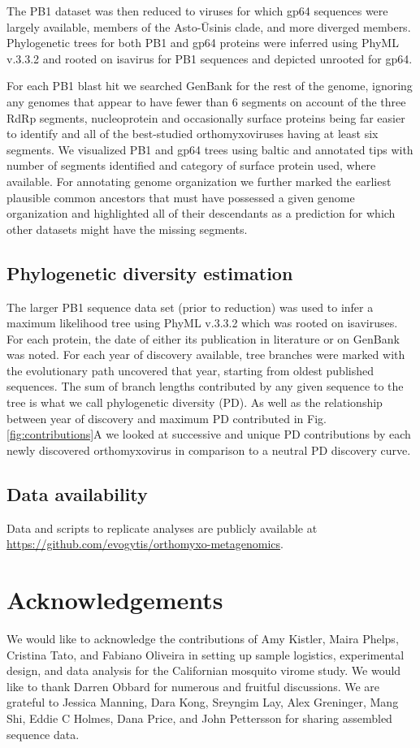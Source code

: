 \documentclass[11pt,twocolumn]{article}
\begin{document}
The PB1 dataset was then reduced to viruses for which gp64 sequences were largely available, members of the Asto-\={U}sinis clade, and more diverged members.
Phylogenetic trees for both PB1 and gp64 proteins were inferred using PhyML v.3.3.2 and rooted on isavirus for PB1 sequences and depicted unrooted for gp64.

For each PB1 blast hit we searched GenBank for the rest of the genome, ignoring any genomes that appear to have fewer than 6 segments on account of the three RdRp segments, nucleoprotein and occasionally surface proteins being far easier to identify and all of the best-studied orthomyxoviruses having at least six segments.
We visualized PB1 and gp64 trees using baltic and annotated tips with number of segments identified and category of surface protein used, where available.
For annotating genome organization we further marked the earliest plausible common ancestors that must have possessed a given genome organization and highlighted all of their descendants as a prediction for which other datasets might have the missing segments.


\subsection{Phylogenetic diversity estimation}

The larger PB1 sequence data set (prior to reduction) was used to infer a maximum likelihood tree using PhyML v.3.3.2 which was rooted on isaviruses.
For each protein, the date of either its publication in literature or on GenBank was noted.
For each year of discovery available, tree branches were marked with the evolutionary path uncovered that year, starting from oldest published sequences.
The sum of branch lengths contributed by any given sequence to the tree is what we call phylogenetic diversity (PD).
As well as the relationship between year of discovery and maximum PD contributed in Fig. \ref{fig:contributions}A we looked at successive and unique PD contributions by each newly discovered orthomyxovirus in comparison to a neutral PD discovery curve.

\subsection{Data availability}

Data and scripts to replicate analyses are publicly available at \url{https://github.com/evogytis/orthomyxo-metagenomics}.

\section{Acknowledgements}
We would like to acknowledge the contributions of Amy Kistler, Maira Phelps, Cristina Tato, and Fabiano Oliveira in setting up sample logistics, experimental design, and data analysis for the Californian mosquito virome study.
We would like to thank Darren Obbard for numerous and fruitful discussions.
We are grateful to Jessica Manning, Dara Kong, Sreyngim Lay, Alex Greninger, Mang Shi, Eddie C Holmes, Dana Price, and John Pettersson for sharing assembled sequence data.
\end{document}
